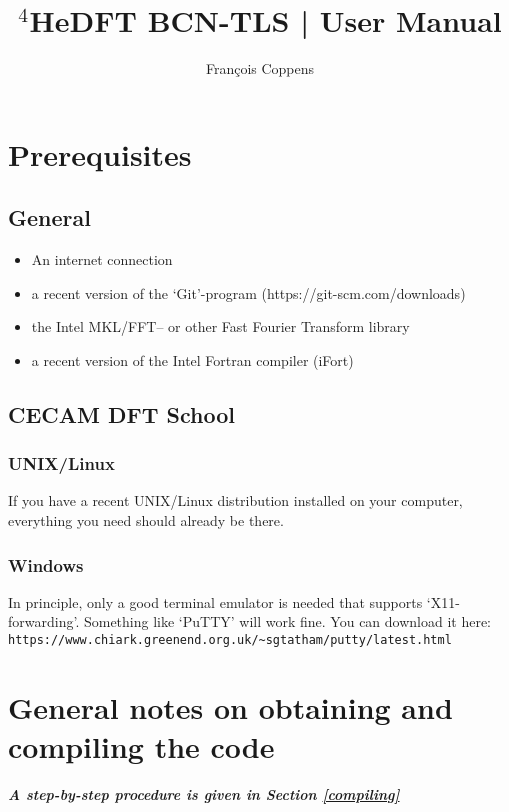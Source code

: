 \documentclass[10pt,a4paper]{article}
\author{Fran\c{c}ois Coppens}
\title{$^4$HeDFT BCN-TLS | User Manual }
\begin{document}
	\maketitle
	\tableofcontents
	\newpage
	\section{Prerequisites}
	\subsection{General}
	\begin{itemize}
		\item An internet connection
		\item a recent version of the `Git'-program (https://git-scm.com/downloads)
		\item the Intel MKL/FFT-- or other Fast Fourier Transform library
		\item a recent version of the Intel Fortran compiler (iFort)
	\end{itemize}

	\subsection{CECAM DFT School}
	\subsubsection{UNIX/Linux}
		If you have a recent UNIX/Linux distribution installed on your computer, everything you need should already be there.
	\subsubsection{Windows}
		In principle, only a good terminal emulator is needed that supports `X11-forwarding'. Something like `PuTTY' will work fine. You can download it here: {\color{lightblue}\verb|https://www.chiark.greenend.org.uk/~sgtatham/putty/latest.html|}

	\section{General notes on obtaining and compiling the code}
	
	{\color{red}\emph{\textbf{A step-by-step procedure is given in Section \ref{compiling}}}}
	
\end{document}
